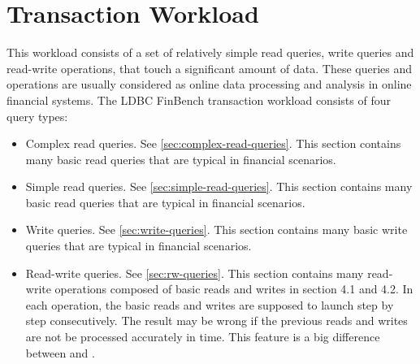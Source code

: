 \chapter{Transaction Workload}
\label{sec:transaction-workload}

This workload consists of a set of relatively simple read queries, write queries
and read-write operations, that touch a significant amount of data. These
queries and operations are usually considered as online data processing and
analysis in online financial systems. The LDBC FinBench transaction workload
consists of four query types:
\begin{itemize}
    \item Complex read queries. See \autoref{sec:complex-read-queries}. This
          section contains many basic read queries that are typical in financial
          scenarios.
    \item Simple read queries. See \autoref{sec:simple-read-queries}. This
          section contains many basic read queries that are typical in financial
          scenarios.
    \item Write queries. See \autoref{sec:write-queries}. This section contains
          many basic write queries that are typical in financial scenarios.
    \item Read-write queries. See \autoref{sec:rw-queries}. This section
          contains many read-write operations composed of basic reads and writes
          in section 4.1 and 4.2. In each operation, the basic reads and writes
          are supposed to launch step by step consecutively. The result may be
          wrong if the previous reads and writes are not be processed accurately
          in time. This feature is a big difference between \ldbcfinbench and
          \ldbcsnb.
\end{itemize}

